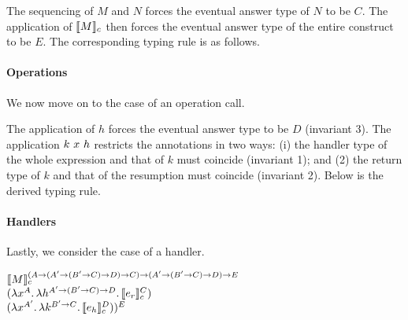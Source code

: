 \bigskip

\noindent The sequencing of $M$ and $N$ forces the eventual answer type of
$N$ to be $C$.
The application of $\llbracket M \rrbracket_c$ then forces the eventual answer type of the 
entire construct to be $E$.
The corresponding typing rule is as follows.


\paragraph{Operations}

We now move on to the case of an operation call.


\noindent The application of $h$ forces the eventual answer type to be
$D$ (invariant 3).
The application $k \ x \ h$ restricts the annotations in two ways:
(i) the handler type of the whole expression and that of $k$ must coincide
(invariant 1); and (2) the return type of $k$ and that of the resumption
must coincide (invariant 2).
Below is the derived typing rule.


\paragraph{Handlers}

Lastly, we consider the case of a handler.

\bigskip

$\llbracket M \rrbracket_c^{(A \rightarrow (A^\prime \rightarrow (B^\prime \rightarrow C) \rightarrow D) \rightarrow C) \rightarrow (A^\prime \rightarrow (B^\prime \rightarrow C) \rightarrow D) \rightarrow E}$ \\
\vspace{1mm} \hspace*{3mm} $(\lambda x^A.\, \lambda h^{A^\prime \rightarrow (B^\prime \rightarrow C) \rightarrow D}.\, \llbracket e_r \rrbracket_c^{C})$ \\
\vspace{1mm} \hspace*{3mm} $(\lambda x^{A^\prime}.\, \lambda k^{B^\prime \rightarrow C}.\, \llbracket e_h \rrbracket_c^{D}))^{E}$

